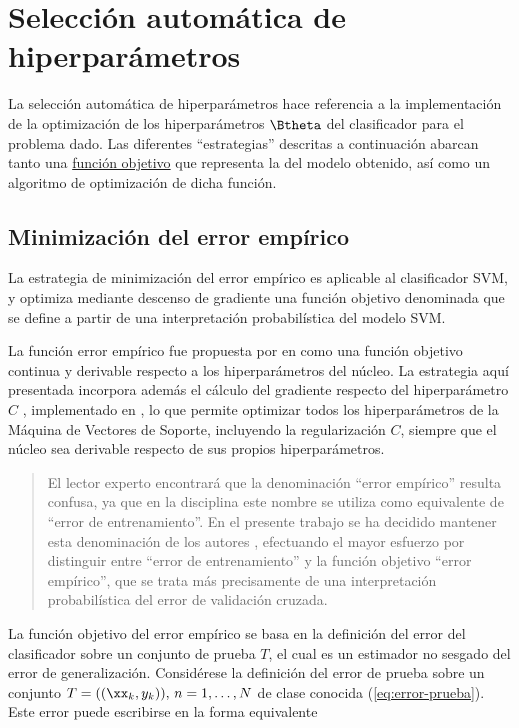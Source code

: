 \section{Selección automática de hiperparámetros}
La selección automática de hiperparámetros hace referencia a la
implementación de la optimización de los hiperparámetros $\Btheta$ del
clasificador para el problema dado.  Las diferentes ``estrategias''
descritas a continuación abarcan tanto una
\hyperref[funcobjetivo]{función objetivo} que representa la
 del modelo obtenido, así como un algoritmo de optimización
de dicha función.


\subsection{Minimización del error empírico}
La estrategia de minimización del error empírico es aplicable al
clasificador SVM, y optimiza mediante descenso de gradiente una
función objetivo denominada  que se define a partir
de una interpretación probabilística del modelo SVM.

La función error empírico fue propuesta por \citeauthor{ayat} en
\cite{ayat} como una función objetivo continua y derivable respecto a
los hiperparámetros del núcleo.  La estrategia aquí presentada
incorpora además el cálculo del gradiente respecto del hiperparámetro
$C$ \cite{keerthi,glasmachers}, implementado en \cite{shark}, lo que
permite optimizar todos los hiperparámetros de la Máquina de Vectores
de Soporte, incluyendo la regularización $C$, siempre que el núcleo
sea derivable respecto de sus propios hiperparámetros.

\begin{quote}
  El lector experto encontrará que la denominación ``error empírico''
  resulta confusa, ya que en la disciplina este nombre se utiliza como
  equivalente de ``error de entrenamiento''. En el presente trabajo se
  ha decidido mantener esta denominación de los autores \cite{ayat},
  efectuando el mayor esfuerzo por distinguir entre ``error de
  entrenamiento'' y la función objetivo ``error empírico'', que se
  trata más precisamente de una interpretación probabilística del
  error de validación cruzada.
\end{quote}
La función objetivo del error empírico se basa en la definición del
error del clasificador sobre un conjunto de prueba $T$, el cual es
un estimador
no sesgado del error de generalización.  Considérese la definición del
error de prueba sobre un conjunto $T=((\xx_k,y_k)),\,n=1,\ldots,N$ de
clase conocida (\autoref{eq:error-prueba}).  Este error puede
escribirse en la forma equivalente

